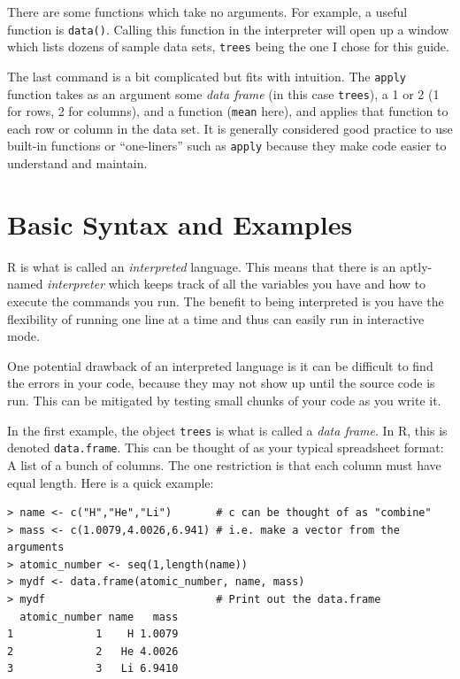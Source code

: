 \documentclass[12pt]{article}
\begin{document}
There are some functions which take no arguments. For example, a useful function is \verb|data()|. Calling this function in the interpreter will open up a window which lists dozens of sample data sets, \verb|trees| being the one I chose for this guide.

The last command is a bit complicated but fits with intuition. The \verb|apply| function takes as an argument some \emph{data frame} (in this case \verb|trees|), a 1 or 2 (1 for rows, 2 for columns), and a function (\verb|mean| here), and applies that function to each row or column in the data set. It is generally considered good practice to use built-in functions or ``one-liners'' such as \verb|apply| because they make code easier to understand and maintain.

\section{Basic Syntax and Examples}

R is what is called an \emph{interpreted} language. This means that there is an aptly-named \emph{interpreter} which keeps track of all the variables you have and how to execute the commands you run. The benefit to being interpreted is you have the flexibility of running one line at a time and thus can easily run in interactive mode.

One potential drawback of an interpreted language is it can be difficult to find the errors in your code, because they may not show up until the source code is run. This can be mitigated by testing small chunks of your code as you write it.

In the first example, the object \verb|trees| is what is called a \emph{data frame}. In R, this is denoted \verb|data.frame|. This can be thought of as your typical spreadsheet format: A list of a bunch of columns. The one restriction is that each column must have equal length. Here is a quick example:

\begin{Verbatim}[frame=single, fontsize=\small]
> name <- c("H","He","Li")       # c can be thought of as "combine"
> mass <- c(1.0079,4.0026,6.941) # i.e. make a vector from the arguments
> atomic_number <- seq(1,length(name))
> mydf <- data.frame(atomic_number, name, mass)
> mydf                           # Print out the data.frame
  atomic_number name   mass
1             1    H 1.0079
2             2   He 4.0026
3             3   Li 6.9410
\end{Verbatim}
\end{document}
